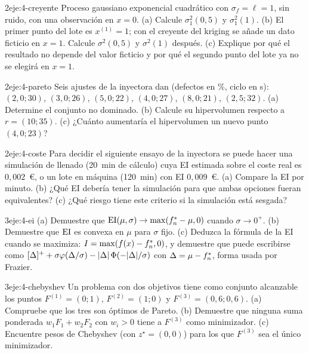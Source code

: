 \begin{ejercicio}{2}{eje:4-creyente}
Proceso gaussiano exponencial cuadrático con $\sigma_f=\ell=1$, sin ruido, con una observación en $x=0$. (a) Calcule $\sigma_1^2(0{,}5)$ y $\sigma_1^2(1)$. (b) El primer punto del lote es $x^{(1)}=1$; con el creyente del kriging se añade un dato ficticio en $x=1$. Calcule $\sigma^2(0{,}5)$ y $\sigma^2(1)$ después. (c) Explique por qué el resultado no depende del valor ficticio y por qué el segundo punto del lote ya no se elegirá en $x=1$.
\end{ejercicio}

\begin{ejercicio}{2}{eje:4-pareto}
Seis ajustes de la inyectora dan (defectos en \%, ciclo en s): $(2{,}0;30)$, $(3{,}0;26)$, $(5{,}0;22)$, $(4{,}0;27)$, $(8{,}0;21)$, $(2{,}5;32)$. (a) Determine el conjunto no dominado. (b) Calcule su hipervolumen respecto a $r=(10;35)$. (c) ¿Cuánto aumentaría el hipervolumen un nuevo punto $(4{,}0;23)$?
\end{ejercicio}

\begin{ejercicio}{2}{eje:4-coste}
Para decidir el siguiente ensayo de la inyectora se puede hacer una simulación de llenado (20~min de cálculo) cuya EI estimada sobre el coste real es $0{,}002$~€, o un lote en máquina (120~min) con EI $0{,}009$~€. (a) Compare la EI por minuto. (b) ¿Qué EI debería tener la simulación para que ambas opciones fueran equivalentes? (c) ¿Qué riesgo tiene este criterio si la simulación está sesgada?
\end{ejercicio}

\begin{ejercicio}{3}{eje:4-ei}
(a) Demuestre que $\operatorname{EI}(\mu,\sigma)\to\max(f^{*}_{n}-\mu,0)$ cuando $\sigma\to 0^+$. (b) Demuestre que $\operatorname{EI}$ es convexa en $\mu$ para $\sigma$ fijo. (c) Deduzca la fórmula de la EI cuando se maximiza: $I=\max(f(x)-f^{*}_{n},0)$, y demuestre que puede escribirse como $[\Delta]^++\sigma\varphi(\Delta/\sigma)-\lvert\Delta\rvert\,\Phi(-\lvert\Delta\rvert/\sigma)$ con $\Delta=\mu-f^{*}_{n}$, forma usada por Frazier.
\end{ejercicio}

\begin{ejercicio}{3}{eje:4-chebyshev}
Un problema con dos objetivos tiene como conjunto alcanzable los puntos $F^{(1)}=(0;1)$, $F^{(2)}=(1;0)$ y $F^{(3)}=(0{,}6;0{,}6)$. (a) Compruebe que los tres son óptimos de Pareto. (b) Demuestre que ninguna suma ponderada $w_1F_1+w_2F_2$ con $w_i>0$ tiene a $F^{(3)}$ como minimizador. (c) Encuentre pesos de Chebyshev (con $z^\star=(0,0)$) para los que $F^{(3)}$ sea el único minimizador.
\end{ejercicio}
